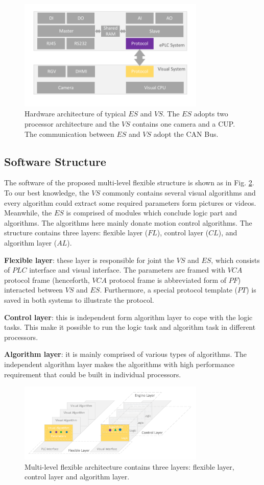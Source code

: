 \documentclass[journal,UTF8]{IEEEtran}
\begin{document}
\begin{figure}
	\centering
	\includegraphics[width=3.5in]{fig/Hardware.pdf}
	\caption{Hardware architecture of typical $ES$ and $VS$. The $ES$ adopts two processor architecture and the $VS$ contains one camera and a CUP. The communication between $ES$ and $VS$ adopt the CAN Bus.}
	\label{fig:Hardware}
\end{figure}
\subsection{Software Structure}
The software of the proposed multi-level flexible structure is shown as in Fig. \ref{fig:Software}. To our best knowledge, the $VS$ commonly contains several visual algorithms and every algorithm could extract some required parameters form pictures or videos. Meanwhile, the $ES$ is comprised of modules which conclude logic part and algorithms. The algorithms here mainly donate motion control algorithms. The structure contains three layers: flexible layer ($FL$), control layer ($CL$), and algorithm layer ($AL$).

\textbf{Flexible layer}: these layer is responsible for joint the $VS$ and $ES$, which consists of $PLC$ interface and visual interface. The parameters are framed with $VCA$ protocol frame (henceforth, $VCA$ protocol frame is abbreviated form of $PF$) interacted between $VS$ and $ES$. Furthermore, a special protocol template ($PT$) is saved in both systems to illustrate the protocol.

\textbf{Control layer}: this is independent form algorithm layer to cope with the logic tasks. This make it possible to run the logic task and algorithm task in different processors.

\textbf{Algorithm layer}: it is mainly comprised of various types of algorithms. The independent algorithm layer makes the algorithms with high performance requirement that could be built in individual processors. 


\begin{figure}
	\centering
	\includegraphics[width=3.5in]{fig/Software.pdf}
	\caption{Multi-level flexible architecture contains three layers: flexible layer, control layer and algorithm layer.}
	\label{fig:Software}
\end{figure}
\end{document}
